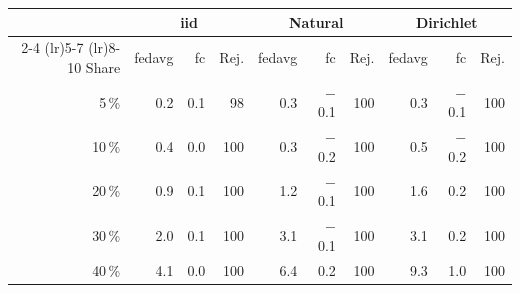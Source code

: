 \begin{tabular}{rrrrrrrrrr}
\toprule
 & \multicolumn{3}{c}{\gls{iid}} & \multicolumn{3}{c}{Natural} & \multicolumn{3}{c}{Dirichlet} \\
\cmidrule(lr){2-4} \cmidrule(lr){5-7} \cmidrule(lr){8-10}
Share & \gls{fedavg} & \gls{fc} & Rej. & \gls{fedavg} & \gls{fc} & Rej. & \gls{fedavg} & \gls{fc} & Rej. \\
\midrule
5\,\% & 0.2 & 0.1 & 98 & 0.3 & $-$0.1 & 100 & 0.3 & $-$0.1 & 100 \\
10\,\% & 0.4 & 0.0 & 100 & 0.3 & $-$0.2 & 100 & 0.5 & $-$0.2 & 100 \\
20\,\% & 0.9 & 0.1 & 100 & 1.2 & $-$0.1 & 100 & 1.6 & 0.2 & 100 \\
30\,\% & 2.0 & 0.1 & 100 & 3.1 & $-$0.1 & 100 & 3.1 & 0.2 & 100 \\
40\,\% & 4.1 & 0.0 & 100 & 6.4 & 0.2 & 100 & 9.3 & 1.0 & 100 \\
\bottomrule
\end{tabular}
